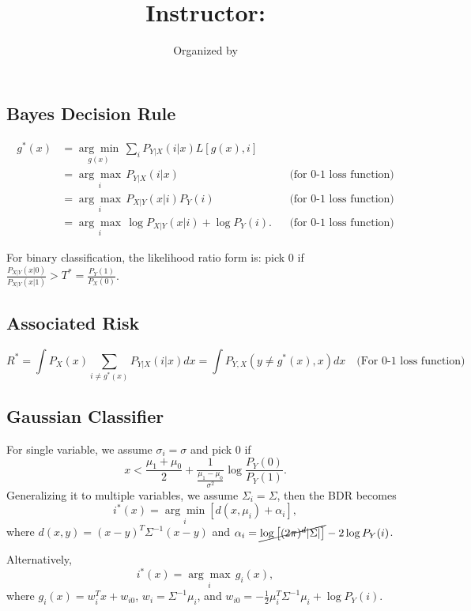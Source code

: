 \documentclass{article}
\title{
    \vspace{2in}
    \textsc{\Large\hmwkInstitution} \\
    \vspace{0.2in}
    \textmd{\textbf{\hmwkTitle}}\\
    \vspace{0.2in}\large{Instructor: \textit{\hmwkInstructor}}
}
\author{
  Organized by \hmwkAuthorName
}
\date{}
\newenvironment{topic}[1]{\subsection*{#1}}{}
\begin{document}
\maketitle

\thispagestyle{empty}
\clearpage
{} 

\pagebreak





\begin{topic}{Bayes Decision Rule}
    \begin{align*}
        g^*(x) 
        &= \underset{g(x)}{\arg \min} \, \sum_i P_{Y|X}(i|x)L[g(x), i] \\
        &= \underset{i}{\arg \max} \, P_{Y|X}(i|x) && \text{(for 0-1 loss function)} \\
        &= \underset{i}{\arg \max} \, P_{X|Y}(x|i)P_Y(i) && \text{(for 0-1 loss function)} \\
        &= \underset{i}{\arg \max} \, \log P_{X|Y}(x|i) + \log P_Y(i). && \text{(for 0-1 loss function)}
    \end{align*}
    
    For binary classification, the likelihood ratio form is: pick $0$ if $\frac{P_{X|Y}(x|0)}{P_{X|Y}(x|1)} > T^* = \frac{P_Y(1)}{P_X(0)}$.
\end{topic}

\begin{topic}{Associated Risk}
    \[
        R^* = \int P_X(x) \sum_{i \neq g^*(x)} P_{Y|X}(i|x) dx = \int P_{Y,X}(y \neq g^*(x), x) dx \quad \text{(For 0-1 loss function)}
    \]
\end{topic}

\begin{topic}{Gaussian Classifier}
    For single variable, we assume $\sigma_i = \sigma$ and pick 0 if
    \[
        x < \frac{\mu_1 + \mu_0}{2} + \frac{1}{\frac{\mu_1 - \mu_0}{\sigma^2}}\log \frac{P_Y(0)}{P_Y(1)}.
    \]
    Generalizing it to multiple variables, we assume $\Sigma_i = \Sigma$, then the BDR becomes
    \[
        i^*(x) = \underset{i}{\arg \min}[d(x, \mu_i) + \alpha_i],
    \]
    where $d(x, y) = (x - y)^T\Sigma^{-1}(x - y)$ and $\alpha_i = \cancel{\log\left[(2\pi)^d|\Sigma|\right]} - 2\log P_Y(i)$.

    Alternatively,
    \[
        i^*(x) = \underset{i}{\arg \max} \, g_i(x),
    \]
    where $g_i(x) = w_i^Tx + w_{i0}$, $w_i = \Sigma^{-1}\mu_i$, and $w_{i0} = -\frac{1}{2}\mu_i^T\Sigma^{-1}\mu_i + \log P_Y(i)$.
\end{topic}
\end{document}
